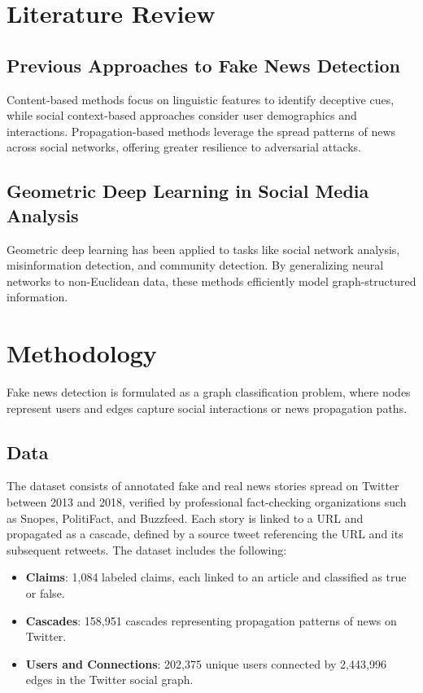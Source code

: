 \documentclass[sigconf,nonacm]{acmart}
\begin{document}
\section{Literature Review}
\subsection{Previous Approaches to Fake News Detection}
Content-based methods focus on linguistic features to identify deceptive cues, while social context-based approaches consider user demographics and interactions. Propagation-based methods leverage the spread patterns of news across social networks, offering greater resilience to adversarial attacks.

\subsection{Geometric Deep Learning in Social Media Analysis}
Geometric deep learning has been applied to tasks like social network analysis, misinformation detection, and community detection. By generalizing neural networks to non-Euclidean data, these methods efficiently model graph-structured information.

\section{Methodology}

Fake news detection is formulated as a graph classification problem, where nodes represent users and edges capture social interactions or news propagation paths.

\subsection{Data}

The dataset consists of annotated fake and real news stories spread on Twitter between 2013 and 2018, verified by professional fact-checking organizations such as Snopes, PolitiFact, and Buzzfeed. Each story is linked to a URL and propagated as a cascade, defined by a source tweet referencing the URL and its subsequent retweets. The dataset includes the following:

\begin{itemize} \item \textbf{Claims}: 1,084 labeled claims, each linked to an article and classified as true or false. \item \textbf{Cascades}: 158,951 cascades representing propagation patterns of news on Twitter. \item \textbf{Users and Connections}: 202,375 unique users connected by 2,443,996 edges in the Twitter social graph. \end{itemize}
\end{document}

